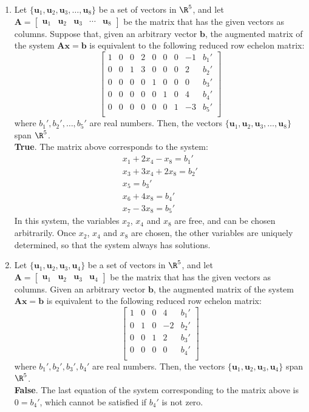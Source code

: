\documentclass[12pt]{article}
\begin{document}
\begin{enumerate}
\item Let $\{\mathbf{u}_1, \mathbf{u}_2, \mathbf{u}_3,\ldots, \mathbf{u}_8\}$ be a set of vectors in $\R^5$, and let 
$\mathbf{A}=[\begin{matrix} \mathbf{u}_1 & \mathbf{u}_2 & \mathbf{u}_3 & \cdots & \mathbf{u}_8\end{matrix}]$ be the matrix that has the given vectors as columns. 
Suppose that, given an arbitrary vector $\mathbf{b}$, the augmented matrix of the system $\mathbf{A}\mathbf{x}=\mathbf{b}$ is equivalent to the following reduced row echelon matrix: 
\[
\left[\begin{matrix}
1&0&0&2&0&0&0&-1 & b_1'\\ 
0&0&1&3&0&0&0&2 & b_2'\\ 
0&0&0&0&1&0&0&0& b_3'\\ 
0&0&0&0&0&1&0&4& b_4'\\ 
0&0&0&0&0&0&1&-3& b_5'\\ 
\end{matrix}\right]
\]
where $b_1',b_2',\ldots,b_5'$ are real numbers. Then, the vectors $\{\mathbf{u}_1, \mathbf{u}_2, \mathbf{u}_3,\ldots, \mathbf{u}_8\}$ span $\R^5$.\\
\textbf{True}. The matrix above corresponds to the system:
\[
\begin{matrix}
x_1+2x_4-x_8=b_1'\\
x_3+3x_4+2x_8=b_2'\\
x_5=b_3'\\
x_6+4x_8=b_4'\\
x_7-3x_8=b_5'
\end{matrix}
\]
In this system, the variables $x_2$, $x_4$ and $x_8$ are free, and can be chosen arbitrarily. Once $x_2$, $x_4$ and $x_8$ are chosen, the other variables are uniquely determined, so that the system always has solutions.

\item Let $\{\mathbf{u}_1, \mathbf{u}_2, \mathbf{u}_3, \mathbf{u}_4\}$ be a set of vectors in $\R^5$, and let 
$\mathbf{A}=[\begin{matrix} \mathbf{u}_1 & \mathbf{u}_2 & \mathbf{u}_3 & \mathbf{u}_4 \end{matrix}]$ be the matrix that has the given vectors as columns. Given an arbitrary vector $\mathbf{b}$, the augmented matrix of the system $\mathbf{A}\mathbf{x}=\mathbf{b}$ is equivalent to the following reduced row echelon matrix: 
\[
\left[\begin{matrix}
1&0&0&4 & b_1'\\ 
0&1&0&-2& b_2'\\ 
0&0&1& 2& b_3'\\ 
0&0&0&0& b_4'\\ 
\end{matrix}\right]
\]
where $b_1',b_2',b_3',b_4'$ are real numbers. Then, the vectors $\{\mathbf{u}_1, \mathbf{u}_2, \mathbf{u}_3,\mathbf{u}_4\}$ span $\R^5$.\\
\textbf{False}. The last equation of the system corresponding to the matrix above is $0=b_4'$, which cannot be satisfied if $b_4'$ is not zero.



\end{enumerate}
\end{document}

